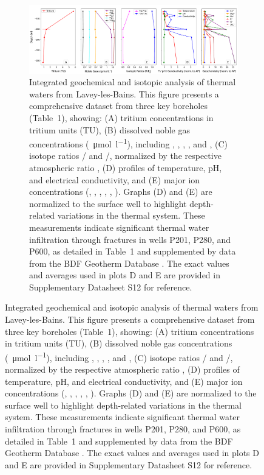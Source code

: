 \begin{figure}
\begin{figure}[H]
    \centering
    \includegraphics[width=1\textwidth]{chapters/06_appendix/SI_C2/geochemistry_full_plot.pdf}
    \caption{Integrated geochemical and isotopic analysis of thermal waters from Lavey-les-Bains.
    This figure presents a comprehensive dataset from three key boreholes (Table~1), showing: 
    (A) tritium concentrations in tritium units (TU), 
    (B) dissolved noble gas concentrations (\SI{}{\micro\mole\per\litre}), including , , , , and , 
    (C) isotope ratios / and /, normalized by the respective atmospheric ratio , 
    (D) profiles of temperature, pH, and electrical conductivity, and 
    (E) major ion concentrations (, , , , , ).
    Graphs (D) and (E) are normalized to the surface well to highlight depth-related variations in the thermal system.
    These measurements indicate significant thermal water infiltration through fractures in wells P201, P280, and P600, as detailed in Table~1 and supplemented by data from the BDF Geotherm Database \citep{sonney2010database}. 
    The exact values and averages used in plots D and E are provided in Supplementary Datasheet S12 for reference.}
    \label{figSI:geochemistry}
\end{figure}
\end{figure}

